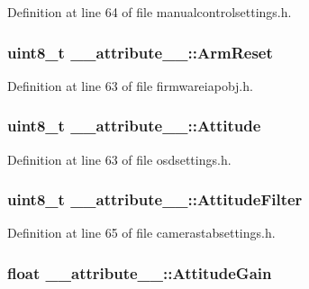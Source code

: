 \-Definition at line 64 of file manualcontrolsettings.\-h.

\hypertarget{struct____attribute_____ae48143a7ddd8553b39bdba58ab9103ff}{
\subsubsection[{\-Arm\-Reset}]{\setlength{\rightskip}{0pt plus 5cm}uint8\-\_\-t {\bf \-\_\-\-\_\-attribute\-\_\-\-\_\-\-::\-Arm\-Reset}}}\label{struct____attribute_____ae48143a7ddd8553b39bdba58ab9103ff}


\-Definition at line 63 of file firmwareiapobj.\-h.

\hypertarget{struct____attribute_____ad91234c58bd136744bc7a1f7f7ae28fb}{
\subsubsection[{\-Attitude}]{\setlength{\rightskip}{0pt plus 5cm}uint8\-\_\-t {\bf \-\_\-\-\_\-attribute\-\_\-\-\_\-\-::\-Attitude}}}\label{struct____attribute_____ad91234c58bd136744bc7a1f7f7ae28fb}


\-Definition at line 63 of file osdsettings.\-h.

\hypertarget{struct____attribute_____a1ddf626b63ed6add48beafc2d9b5d47e}{
\subsubsection[{\-Attitude\-Filter}]{\setlength{\rightskip}{0pt plus 5cm}uint8\-\_\-t {\bf \-\_\-\-\_\-attribute\-\_\-\-\_\-\-::\-Attitude\-Filter}}}\label{struct____attribute_____a1ddf626b63ed6add48beafc2d9b5d47e}


\-Definition at line 65 of file camerastabsettings.\-h.

\hypertarget{struct____attribute_____a425e1c6f543067ec27ec074ca6f8e9e1}{
\subsubsection[{\-Attitude\-Gain}]{\setlength{\rightskip}{0pt plus 5cm}float {\bf \-\_\-\-\_\-attribute\-\_\-\-\_\-\-::\-Attitude\-Gain}}}\label{struct____attribute_____a425e1c6f543067ec27ec074ca6f8e9e1}


